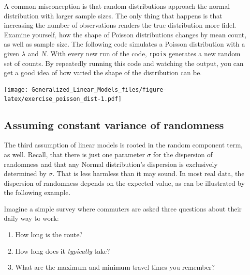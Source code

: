 \documentclass[]{svmono}
\newenvironment{Shaded}{\begin{snugshade}}{\end{snugshade}}
\newcommand{\KeywordTok}[1]{\textcolor[rgb]{0.13,0.29,0.53}{\textbf{#1}}}
\newcommand{\DataTypeTok}[1]{\textcolor[rgb]{0.13,0.29,0.53}{#1}}
\newcommand{\DecValTok}[1]{\textcolor[rgb]{0.00,0.00,0.81}{#1}}
\newcommand{\StringTok}[1]{\textcolor[rgb]{0.31,0.60,0.02}{#1}}
\newcommand{\OperatorTok}[1]{\textcolor[rgb]{0.81,0.36,0.00}{\textbf{#1}}}
\newcommand{\NormalTok}[1]{#1}
\providecommand{\tightlist}{%
  \setlength{\itemsep}{0pt}\setlength{\parskip}{0pt}}
\theoremstyle{definition}
\theoremstyle{definition}
\theoremstyle{definition}
\theoremstyle{remark}
\begin{document}
A common misconception is that random distributions approach the normal
distribution with larger sample sizes. The only thing that happens is
that increasing the number of observations renders the true distribution
more fidel. Examine yourself, how the shape of Poisson distributions
changes by mean count, as well as sample size. The following code
simulates a Poisson distribution with a given \(\lambda\) and \(N\).
With every new run of the code, \texttt{rpois} generates a new random
set of counts. By repeatedly running this code and watching the output,
you can get a good idea of how varied the shape of the distribution can
be.

\begin{Shaded}
\end{Shaded}

\texttt{[image: Generalized\_Linear\_Models\_files/figure-latex/exercise\_poisson\_dist-1.pdf]}

\subsection{Assuming constant variance of
randomness}\label{assume-constant-variance}

The third assumption of linear models is rooted in the random component
term, as well. Recall, that there is just one parameter \(\sigma\) for
the dispersion of randomness and that any Normal distribution's
dispersion is exclusively determined by \(\sigma\). That is less
harmless than it may sound. In most real data, the dispersion of
randomness depends on the expected value, as can be illustrated by the
following example.

Imagine a simple survey where commuters are asked three questions about
their daily way to work:

\begin{enumerate}
\def\labelenumi{\arabic{enumi}.}
\tightlist
\item
  How long is the route?
\item
  How long does it \emph{typically} take?
\item
  What are the maximum and minimum travel times you remember?
\end{enumerate}
\end{document}
